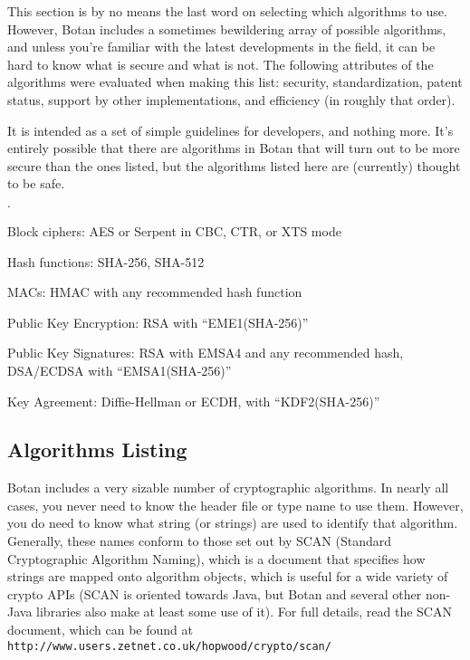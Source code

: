 \documentclass{article}
\newcommand{\url}[1]{\texttt{#1}}
\begin{document}
This section is by no means the last word on selecting which
algorithms to use.  However, Botan includes a sometimes bewildering
array of possible algorithms, and unless you're familiar with the
latest developments in the field, it can be hard to know what is
secure and what is not. The following attributes of the algorithms
were evaluated when making this list: security, standardization,
patent status, support by other implementations, and efficiency (in
roughly that order).

It is intended as a set of simple guidelines for developers, and
nothing more.  It's entirely possible that there are algorithms in
Botan that will turn out to be more secure than the ones listed, but
the algorithms listed here are (currently) thought to be safe.

\begin{list}{$\cdot$}
  \item Block ciphers: AES or Serpent in CBC, CTR, or XTS mode

  \item Hash functions: SHA-256, SHA-512

  \item MACs: HMAC with any recommended hash function

  \item Public Key Encryption: RSA with ``EME1(SHA-256)''

  \item Public Key Signatures: RSA with EMSA4 and any recommended
    hash, DSA/ECDSA with ``EMSA1(SHA-256)''

  \item Key Agreement: Diffie-Hellman or ECDH, with ``KDF2(SHA-256)''
\end{list}

\subsection{Algorithms Listing}

Botan includes a very sizable number of cryptographic algorithms. In
nearly all cases, you never need to know the header file or type name
to use them. However, you do need to know what string (or strings) are
used to identify that algorithm. Generally, these names conform to
those set out by SCAN (Standard Cryptographic Algorithm Naming), which
is a document that specifies how strings are mapped onto algorithm
objects, which is useful for a wide variety of crypto APIs (SCAN is
oriented towards Java, but Botan and several other non-Java libraries
also make at least some use of it). For full details, read the SCAN
document, which can be found at
\url{http://www.users.zetnet.co.uk/hopwood/crypto/scan/}
\end{document}
